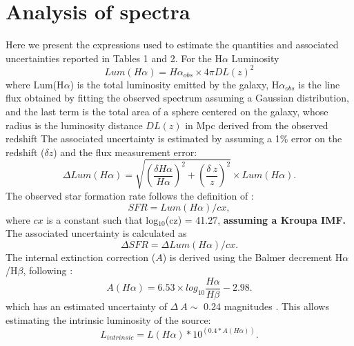 \documentclass[twocolumn]{aastex63}
\begin{document}
{\begin{thebibliography}{}
\end{thebibliography}



\eject

\appendix

\appendix
\section{Analysis of spectra}
Here we present the expressions used to estimate the quantities and associated uncertainties reported in Tables 1 and 2.
For the H$\alpha$ Luminosity 
\begin{equation}
    Lum(H\alpha) = H\alpha_{obs}  \times 4\pi {DL(z)}^2 
\end{equation}
where  Lum(H$\alpha$) is the total luminosity emitted by the galaxy, H$\alpha_{obs}$ is the line flux obtained by fitting the observed spectrum assuming a Gaussian distribution, and the last term is the total area of a sphere centered on the galaxy, whose radius is the luminosity distance $DL(z)$ in Mpc derived from the observed redshift \citep{Hogg1999}  The associated uncertainty is estimated by assuming a 1\% error on the redshift ($\delta$$z$) and the flux measurement error:
\begin{equation}
    \Delta Lum(H\alpha) = \sqrt{(\frac {\delta H\alpha}{H\alpha})^2 + (\frac {\delta~z}{z})^2} \times Lum(H\alpha).
\end{equation}
The observed star formation rate follows the definition of \citet{Kennicutt2012}:
\begin{equation}
    SFR = Lum(H\alpha)/cx,
\end{equation}
where $cx$ is a constant such that log$_{10}$(cz) = 41.27, {\bf assuming a Kroupa IMF.}
The associated uncertainty is calculated as
\begin{equation}
\Delta SFR = \Delta Lum(H\alpha)/cx.
\end{equation}
The internal extinction correction ($A$) is derived using the  Balmer decrement H$\alpha$/H$\beta$, following \citet{Koyama2015}:
\begin{equation}
    A(H\alpha) = 6.53 \times log_{10}\frac {H\alpha}{H\beta} -2.98. 
\end{equation}
which has an estimated uncertainty of $\Delta~A\sim$ 0.24 magnitudes \citep[][equation 3]{Koyama2015}. This allows estimating the intrinsic luminosity of the source:
\begin{equation}
    L_{intrinsic} = L(H\alpha) * 10^{(0.4*A(H\alpha))}.
\end{equation}
$$}
\end{document}
